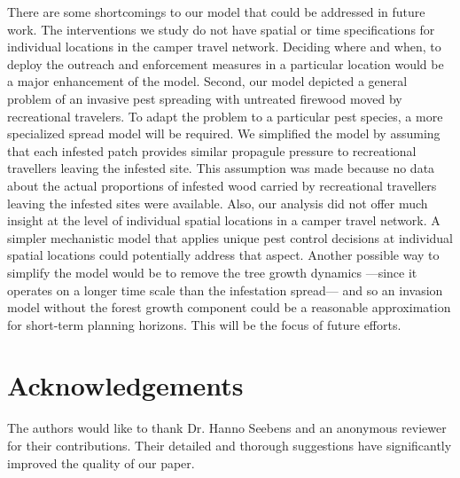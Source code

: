 There are some shortcomings to our model that could be addressed in future work. The interventions we study do not have spatial or time specifications for individual locations in the camper travel network.  Deciding where and when, to deploy the outreach and enforcement measures in a particular location would be a major enhancement of the model. Second, our model depicted a general problem of an invasive pest spreading with untreated firewood moved by recreational travelers. To adapt the problem to a particular pest species, a more specialized spread model will be required. We simplified the model by assuming that each infested patch provides similar propagule pressure to recreational travellers leaving the infested site. This assumption was made because no data about the actual proportions of infested wood carried by recreational travellers leaving the infested sites were available. Also, our analysis did not offer much insight at the level of individual spatial locations in a camper travel network. A simpler mechanistic model that applies unique pest control decisions at individual spatial locations could potentially address that aspect. Another possible way to simplify the model would be to remove the tree growth dynamics —since it operates on a longer time scale than the infestation spread— and so an invasion model without the forest growth component could be a reasonable approximation for short-term planning horizons. This will be the focus of future efforts. 

\section{Acknowledgements}
The authors would like to thank Dr. Hanno Seebens and an anonymous reviewer for their contributions. Their detailed and thorough suggestions have significantly improved the quality of our paper.

% 


